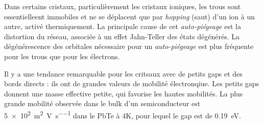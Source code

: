 Dans certains cristaux, particulièrement les cristaux ioniques, les trous sont
essentielleent immobiles et ne se déplacent que par \emph{hopping} (saut) d'un
ion à un autre, activé thermiquement. La principale cause de cet
\emph{auto-piégeage} est la distortion du réseau, associée à un effet Jahn-Teller
des états dégénérés. La dégénérescence des orbitales nécessaire pour un
\emph{auto-piégeage} est plus fréquente pour les trous que pour les électrons.

Il y a une tendance remarquable pour les critsaux avec de petits gaps et des
bords directs : ils ont de grandes valeurs de mobilité électronqiue. Les petits
gaps donnent une masse effective petite, qui favorise les hautes mobilités. La
plus grande mobilité observée dans le bulk d'un semiconducteur est
\SI{5e2}{\square\metre\per\volt\per\second} dans le PbTe à 4K, pour lequel le gap
est de \SI{0.19}{\electronvolt}.
